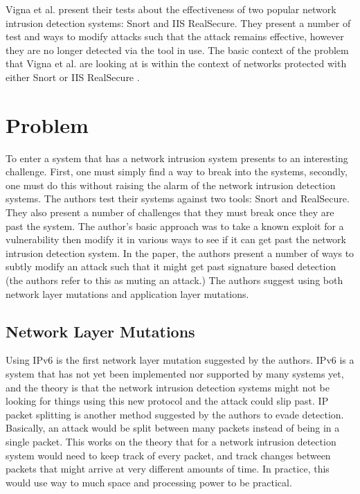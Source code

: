 \documentclass{reading_glasses}
\begin{document}
Vigna et al. present their tests about the effectiveness of two popular network intrusion detection systems: Snort and IIS RealSecure.  They present a number of test and ways to modify attacks such that the attack remains effective, however they are no longer detected via the tool in use.  
The basic context of the problem that Vigna et al. are looking at is within the context of networks protected with either Snort or IIS RealSecure .

\section{Problem}
To enter a system that has a network intrusion system presents to an interesting challenge.  First, one must simply find a way to break into the systems, secondly, one must do this without raising the alarm of the network intrusion detection systems.  The authors test their systems against two tools: Snort and RealSecure.  They also present a number of challenges that they must break once they are past the system.    The author's basic approach was to take a known exploit for a vulnerability then modify it in various ways to see if it can get past the network intrusion detection system.  In the paper, the authors present a number of ways to subtly modify an attack such that it might get past signature based detection (the authors refer to this as muting an attack.)  The authors suggest using both network layer mutations and application layer mutations.

\subsection{Network Layer Mutations}
Using IPv6 is the first network layer mutation suggested by the authors.  IPv6 is a system that has not yet been implemented nor supported by many systems yet, and the theory is that the network intrusion detection systems might not be looking for things using this new protocol and the attack could slip past.  IP packet splitting is another method suggested by the authors to evade detection.  Basically, an attack would be split between many packets instead of being in a single packet.  This works on the theory that for a network intrusion detection system would need to keep track of every packet, and track changes between packets that might arrive at very different amounts of time.  In practice, this would use way to much space and processing power to be practical.
\end{document}
